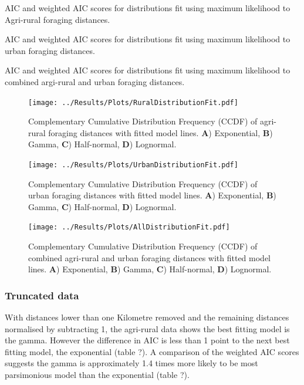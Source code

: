 \documentclass[11pt,usenames,dvipsnames]{article}
\begin{document}
\begin{table}[H]
	\centering
	\caption{AIC and weighted AIC scores for distributions fit using maximum likelihood to Agri-rural foraging distances.}
	
\end{table}
\begin{table}[H]
	\centering
	\caption{AIC and weighted AIC scores for distributions fit using maximum likelihood to urban foraging distances.}
	
\end{table}
\begin{table}[H]
	\centering
	\caption{AIC and weighted AIC scores for distributions fit using maximum likelihood to combined argi-rural and urban foraging distances.}
	
\end{table}

\begin{figure}[H]
	\centering
	\texttt{[image: ../Results/Plots/RuralDistributionFit.pdf]}
	\caption{Complementary Cumulative Distribution Frequency (CCDF) of agri-rural foraging distances with fitted model lines. \textbf{A}) Exponential, \textbf{B}) Gamma, \textbf{C}) Half-normal, \textbf{D}) Lognormal.}
\end{figure}

\begin{figure}[H]
	\centering
	\texttt{[image: ../Results/Plots/UrbanDistributionFit.pdf]}
	\caption{Complementary Cumulative Distribution Frequency (CCDF) of urban foraging distances with fitted model lines. \textbf{A}) Exponential, \textbf{B}) Gamma, \textbf{C}) Half-normal, \textbf{D}) Lognormal.}
\end{figure}

\begin{figure}[H]
	\centering
	\texttt{[image: ../Results/Plots/AllDistributionFit.pdf]}
	\caption{Complementary Cumulative Distribution Frequency (CCDF) of combined agri-rural and urban foraging distances with fitted model lines. \textbf{A}) Exponential, \textbf{B}) Gamma, \textbf{C}) Half-normal, \textbf{D}) Lognormal.}
\end{figure}

\subsubsection{Truncated data}

\hspace{\parindent}
With distances lower than one Kilometre removed and the remaining distances normalised by subtracting 1, the agri-rural data shows the best fitting model is the gamma. However the difference in AIC is less than 1 point to the next best fitting model, the exponential (table ?). A comparison of the weighted AIC scores suggests the gamma is approximately 1.4 times more likely to be most parsimonious model than the exponential (table ?).
\end{document}
